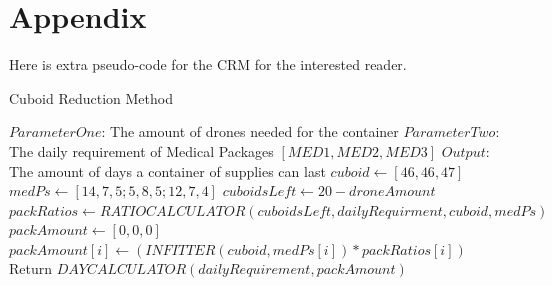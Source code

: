 \documentclass[a4paper,12pt]{article}
\begin{document}
\newpage

\section{Appendix}
Here is extra pseudo-code for the CRM for the interested reader.

\begin{algorithm}
  \caption{Cuboid Reduction Method}
\begin{algorithmic}[1]
  \State $ParameterOne$: The amount of drones needed for the container
  \State $ParameterTwo$: The daily requirement of Medical Packages $[MED 1,MED 2,MED 3]$
  \State $Output$: The amount of days a container of supplies can last
  \State
  \State $cuboid \leftarrow [46, 46, 47]$
  \State $medPs \leftarrow  [14, 7, 5 ; 5, 8, 5 ; 12, 7, 4]$ 
  \State $cuboidsLeft \leftarrow 20 - droneAmount$ 
  \State
  \State $packRatios \leftarrow RATIOCALCULATOR(cuboidsLeft, dailyRequirment, cuboid, medPs)$
  \State
  \State $packAmount \leftarrow [0,0,0] $
  \State $packAmount[i] \leftarrow ( INFITTER(cuboid, medPs[i] ) * packRatios[i] )$
  \EndFor
  \State
  \State Return $DAYCALCULATOR(dailyRequirement, packAmount)$
  \EndProcedure
\end{algorithmic}
\end{algorithm}
\end{document}

